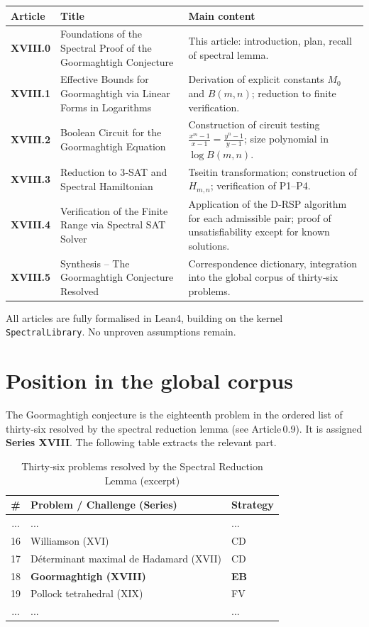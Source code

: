 \documentclass[11pt,a4paper]{article}
\begin{document}
\begin{center}
\small
\begin{tabular}{@{}>{\bfseries}l>{\raggedright\arraybackslash}p{4.5cm}>{\raggedright\arraybackslash}p{6cm}@{}}
\toprule
\textbf{Article} & \textbf{Title} & \textbf{Main content} \\
\midrule
XVIII.0 & Foundations of the Spectral Proof of the Goormaghtigh Conjecture & This article: introduction, plan, recall of spectral lemma. \\
XVIII.1 & Effective Bounds for Goormaghtigh via Linear Forms in Logarithms & Derivation of explicit constants \(M_0\) and \(B(m,n)\); reduction to finite verification. \\
XVIII.2 & Boolean Circuit for the Goormaghtigh Equation & Construction of circuit testing \(\frac{x^{m}-1}{x-1} = \frac{y^{n}-1}{y-1}\); size polynomial in \(\log B(m,n)\). \\
XVIII.3 & Reduction to 3‑SAT and Spectral Hamiltonian & Tseitin transformation; construction of \(H_{m,n}\); verification of P1–P4. \\
XVIII.4 & Verification of the Finite Range via Spectral SAT Solver & Application of the D‑RSP algorithm for each admissible pair; proof of unsatisfiability except for known solutions. \\
XVIII.5 & Synthesis – The Goormaghtigh Conjecture Resolved & Correspondence dictionary, integration into the global corpus of thirty‑six problems. \\
\bottomrule
\end{tabular}
\end{center}

All articles are fully formalised in Lean4, building on the kernel \texttt{SpectralLibrary}. No unproven assumptions remain.

\section{Position in the global corpus}

The Goormaghtigh conjecture is the eighteenth problem in the ordered list of thirty‑six resolved by the spectral reduction lemma (see Article 0.9). It is assigned \textbf{Series XVIII}. The following table extracts the relevant part.

\begin{center}
\begin{longtable}{@{}cll@{}}
\caption{Thirty‑six problems resolved by the Spectral Reduction Lemma (excerpt)}\\
\toprule
\# & Problem / Challenge (Series) & Strategy \\
\midrule
... & ... & ... \\
16 & Williamson (XVI) & CD \\
17 & Déterminant maximal de Hadamard (XVII) & CD \\
18 & \textbf{Goormaghtigh (XVIII)} & \textbf{EB} \\
19 & Pollock tetrahedral (XIX) & FV \\
... & ... & ... \\
\bottomrule
\end{longtable}
\end{center}
\end{document}
